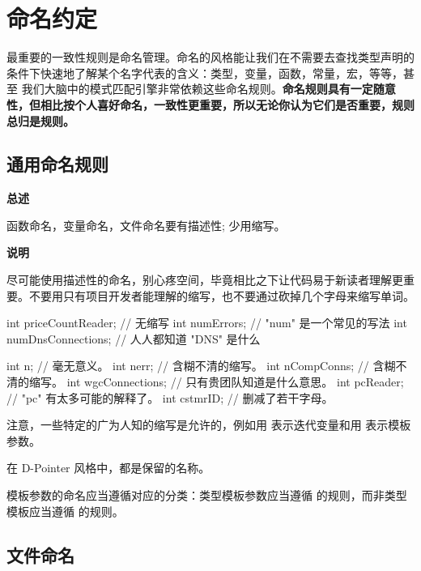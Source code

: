 \chapter{命名约定}

最重要的一致性规则是命名管理。命名的风格能让我们在不需要去查找类型声明的条件下快速地了解某个名字代表的含义：类型，变量，函数，常量，宏，等等，甚至 我们大脑中的模式匹配引擎非常依赖这些命名规则。\textbf{命名规则具有一定随意性，但相比按个人喜好命名，一致性更重要，所以无论你认为它们是否重要，规则总归是规则。}

\section{通用命名规则} \label{general-naming-rules}

\textbf{总述}

函数命名，变量命名，文件命名要有描述性; 少用缩写。

\textbf{说明}

尽可能使用描述性的命名，别心疼空间，毕竟相比之下让代码易于新读者理解更重要。不要用只有项目开发者能理解的缩写，也不要通过砍掉几个字母来缩写单词。

\begin{cppcode}
  int priceCountReader;     // 无缩写
  int numErrors;            // "num" 是一个常见的写法
  int numDnsConnections;    // 人人都知道 "DNS" 是什么
\end{cppcode}

\begin{cppcode}
  int n;                     // 毫无意义。
  int nerr;                  // 含糊不清的缩写。
  int nCompConns;            // 含糊不清的缩写。
  int wgcConnections;        // 只有贵团队知道是什么意思。
  int pcReader;              // "pc" 有太多可能的解释了。
  int cstmrID;               // 删减了若干字母。
\end{cppcode}

注意，一些特定的广为人知的缩写是允许的，例如用  表示迭代变量和用  表示模板参数。

\begin{DWarn}
  在 D-Pointer 风格中，都是保留的名称。
\end{DWarn}

模板参数的命名应当遵循对应的分类：类型模板参数应当遵循  的规则，而非类型模板应当遵循   的规则。

\section{文件命名}

